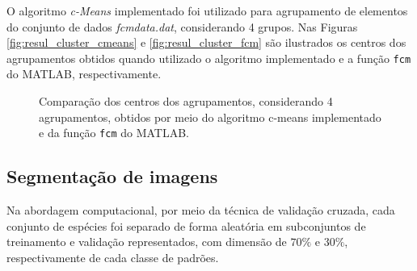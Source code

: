 \documentclass[12pt,a4paper]{article}
\numberwithin{equation}{section}
\begin{document}
O algoritmo \textit{c-Means} implementado foi utilizado para agrupamento de elementos do conjunto de dados \textit{fcmdata.dat}, considerando 4 grupos. Nas Figuras \ref{fig:resul_cluster_cmeans} e \ref{fig:resul_cluster_fcm} são ilustrados os centros dos agrupamentos obtidos quando utilizado o algoritmo implementado e a função \texttt{fcm} do MATLAB, respectivamente.

\begin{figure}[!htbp]
	\centering
	\caption{Comparação dos centros dos agrupamentos, considerando 4 agrupamentos, obtidos por meio do algoritmo c-means implementado e da função \texttt{fcm} do MATLAB.}
\end{figure}

\subsection{Segmentação de imagens}
\label{subsection:seg}

Na abordagem computacional, por meio da técnica de validação cruzada, cada conjunto de espécies foi separado de forma aleatória em subconjuntos de treinamento e validação representados, com dimensão de $70\%$ e $30\%$, respectivamente de cada classe de padrões.
\end{document}

